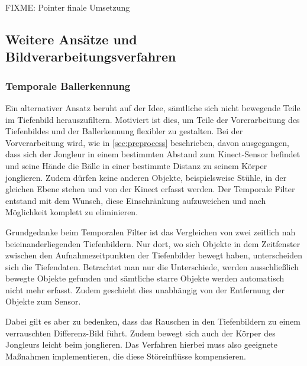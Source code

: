 \documentclass[12pt,a4paper,ngerman]{scrartcl}
\begin{document}
FIXME: Pointer finale Umsetzung

\subsection{Weitere Ansätze und Bildverarbeitungsverfahren}

\subsubsection{Temporale Ballerkennung}
\label{sec:temporal}

Ein alternativer Ansatz beruht auf der Idee, sämtliche sich nicht bewegende Teile im Tiefenbild herauszufiltern. Motiviert ist dies, um Teile der Vorerarbeitung des Tiefenbildes und der Ballerkennung flexibler zu gestalten. Bei der Vorverarbeitung wird, wie in \ref{sec:preprocess} beschrieben, davon ausgegangen, dass sich der Jongleur in einem bestimmten Abstand zum Kinect-Sensor befindet und seine Hände  die Bälle in einer bestimmte Distanz zu seinem Körper jonglieren. Zudem dürfen keine anderen Objekte,
beispielsweise Stühle, in der gleichen Ebene stehen und von der Kinect erfasst werden.
Der Temporale Filter entstand mit dem Wunsch, diese Einschränkung aufzuweichen und nach Möglichkeit komplett zu eliminieren.

Grundgedanke beim Temporalen Filter ist das Vergleichen von zwei zeitlich nah beieinanderliegenden Tiefenbildern.
Nur dort, wo sich Objekte in dem Zeitfenster zwischen den Aufnahmezeitpunkten der Tiefenbilder bewegt haben,
unterscheiden sich die Tiefendaten. Betrachtet man nur die Unterschiede, werden ausschließlich bewegte Objekte gefunden und sämtliche starre Objekte werden automatisch nicht mehr erfasst.
Zudem geschieht dies unabhängig von der Entfernung der Objekte zum Sensor.

Dabei gilt es aber zu bedenken, dass das Rauschen in den Tiefenbildern zu einem verrauschten Differenz-Bild führt. Zudem bewegt sich auch der Körper des Jongleurs leicht beim jonglieren. Das Verfahren hierbei muss also geeignete Maßnahmen implementieren, die diese Störeinflüsse kompensieren.
\end{document}
